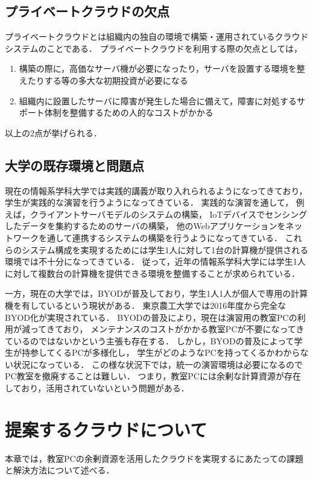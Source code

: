 \documentclass[10pt,a4paper]{jsarticle}
\begin{document}
\subsection{プライベートクラウドの欠点}
プライベートクラウドとは組織内の独自の環境で構築・運用されているクラウドシステムのことである．
プライベートクラウドを利用する際の欠点としては，
\begin{enumerate}
	\item 構築の際に，高価なサーバ機が必要になったり，サーバを設置する環境を整えたりする等の多大な初期投資が必要になる
	\item 組織内に設置したサーバに障害が発生した場合に備えて，障害に対処するサポート体制を整備するための人的なコストがかかる
\end{enumerate}
以上の2点が挙げられる．

\subsection{大学の既存環境と問題点}
現在の情報系学科大学では実践的講義が取り入れられるようになってきており，学生が実践的な演習を行うようになってきている．
実践的な演習を通して，
例えば，クライアントサーバモデルのシステムの構築，
IoTデバイスでセンシングしたデータを集約するためのサーバの構築，
他のWebアプリケーションをネットワークを通して連携するシステムの構築を行うようになってきている．
これらのシステム構成を実現するためには学生1人に対して1台の計算機が提供される環境では不十分になってきている．
従って，近年の情報系学科大学には学生1人に対して複数台の計算機を提供できる環境を整備することが求められている．
\par 一方，現在の大学では，BYODが普及しており，学生1人1人が個人で専用の計算機を有しているという現状がある．
東京農工大学では2016年度から完全なBYOD化が実現されている\cite{nokodai}．
BYODの普及により，現在は演習用の教室PCの利用が減ってきており，
メンテナンスのコストがかかる教室PCが不要になってきているのではないかという主張も存在する．
しかし，BYODの普及によって学生が持参してくるPCが多様化し，
学生がどのようなPCを持ってくるかわからない状況になっている．
この様な状況下では，統一の演習環境は必要になるのでPC教室を撤廃することは難しい．
つまり，教室PCには余剰な計算資源が存在しており，活用されていないという問題がある．

\section{提案するクラウドについて}
本章では，教室PCの余剰資源を活用したクラウドを実現するにあたっての課題と解決方法について述べる．
\end{document}
